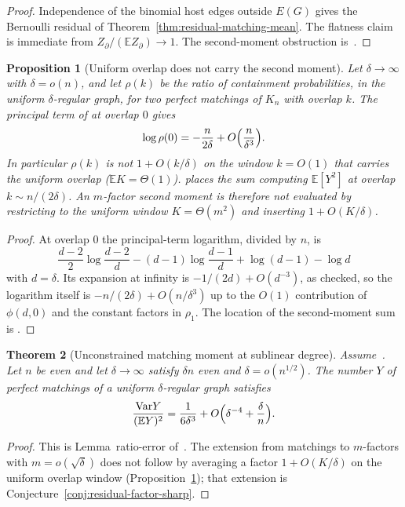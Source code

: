 \documentclass[11pt]{article}
\newtheorem{theorem}{Theorem}
\newtheorem{proposition}[theorem]{Proposition}
\newcommand{\EE}{\mathbb{E}}
\newcommand{\Var}{\mathrm{Var}}
\begin{document}
\begin{proof}
Independence of the binomial host edges outside \(E(G)\) gives the Bernoulli
residual of Theorem~\ref{thm:residual-matching-mean}. The flatness claim is
immediate from \(Z_\partial/(\EE Z_\partial)\to1\). The second-moment obstruction
is~\cite[Proposition~bernoulli-moment]{PlusOneV1}.
\end{proof}

\begin{proposition}[Uniform overlap does not carry the second moment]
\label{prop:overlap-mass}
Let \(\delta\to\infty\) with \(\delta=o(n)\), and let \(\rho(k)\) be the ratio of
containment probabilities, in the uniform \(\delta\)-regular graph, for two
perfect matchings of \(K_n\) with overlap \(k\). The principal term of
\cite[Corollary~15]{Gao21} at overlap \(0\) gives
\[
\log\rho(0)=-\frac{n}{2\delta}+O\Bigl(\frac{n}{\delta^3}\Bigr).
\]
In particular \(\rho(k)\) is not \(1+O(k/\delta)\) on the window \(k=O(1)\) that
carries the uniform overlap (\(\EE K=\Theta(1)\)).
\cite[Lemma~18]{Gao21} places the sum computing \(\EE[Y^2]\) at overlap
\(k\sim n/(2\delta)\). An \(m\)-factor second moment is therefore not evaluated
by restricting to the uniform window \(K=\Theta(m^2)\) and inserting
\(1+O(K/\delta)\).
\end{proposition}

\begin{proof}
At overlap \(0\) the principal-term logarithm, divided by \(n\), is
\[
\frac{d-2}{2}\log\frac{d-2}{d}-(d-1)\log\frac{d-1}{d}+\log(d-1)-\log d
\]
with \(d=\delta\). Its expansion at infinity is \(-1/(2d)+O(d^{-3})\), as
checked, so the logarithm itself is \(-n/(2\delta)+O(n/\delta^3)\) up to the
\(O(1)\) contribution of \(\phi(d,0)\) and the constant factors in
\(\rho_1\). The location of the second-moment sum is
\cite[Lemma~18]{Gao21}.
\end{proof}

\begin{theorem}[Unconstrained matching moment at sublinear degree]
\label{thm:residual-factor-fixed}
Assume~\cite[Theorem~6]{Gao20}. Let \(n\) be even and let \(\delta\to\infty\)
satisfy \(\delta n\) even and \(\delta=o(n^{1/2})\). The number \(Y\) of perfect
matchings of a uniform \(\delta\)-regular graph satisfies
\[
\frac{\Var Y}{(\EE Y)^2}
=
\frac1{6\delta^3}+O\Bigl(\delta^{-4}+\frac{\delta}{n}\Bigr).
\]
\end{theorem}

\begin{proof}
This is Lemma~ratio-error of~\cite{PlusOneV1}. The extension from matchings to
\(m\)-factors with \(m=o(\sqrt\delta)\) does not follow by averaging a factor
\(1+O(K/\delta)\) on the uniform overlap window
(Proposition~\ref{prop:overlap-mass}); that extension is
Conjecture~\ref{conj:residual-factor-sharp}.
\end{proof}
\end{document}

